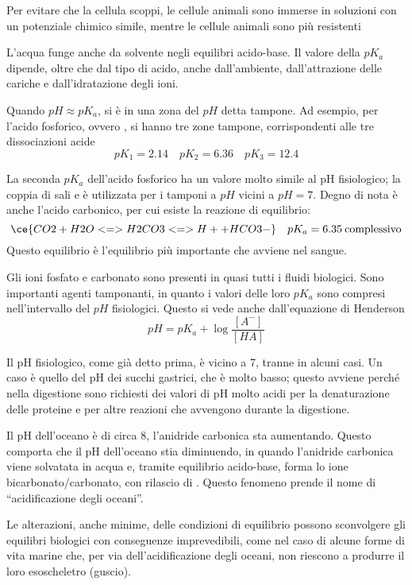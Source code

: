 
Per evitare che la cellula scoppi, le cellule animali sono immerse in
soluzioni con un potenziale chimico simile, mentre le cellule animali
sono più resistenti

L'acqua funge anche da solvente negli equilibri acido-base. Il valore
della \(pK_a\) dipende, oltre che dal tipo di acido, anche
dall'ambiente, dall'attrazione delle cariche e dall'idratazione degli
ioni.

Quando \(pH \approx pK_a\), si è in una zona del \(pH\) detta tampone.
Ad esempio, per l'acido fosforico, ovvero , si hanno tre zone
tampone, corrispondenti alle tre dissociazioni acide
\[
    pK_1=2.14 \quad pK_2=6.36 \quad pK_3=12.4
\]

La seconda \(pK_a\) dell'acido fosforico ha un valore molto simile al pH
fisiologico; la coppia di sali  e  è utilizzata
per i tamponi a \(pH\) vicini a \(pH=7\). Degno di nota è anche l'acido
carbonico, per cui esiste la reazione di equilibrio:
\[
\ce{CO2 + H2O <=> H2CO3 <=> H+ + HCO3-} \quad pK_a=6.35 \:
\text{complessivo}
\]
Questo equilibrio è l'equilibrio più importante
che avviene nel sangue.

Gli ioni fosfato e carbonato sono presenti in quasi tutti i fluidi
biologici. Sono importanti agenti tamponanti, in quanto i valori delle
loro \(pK_a\) sono compresi nell'intervallo del \(pH\) fisiologici.
Questo si vede anche dall'equazione di Henderson
\[
pH = pK_a + \log \frac{[A^-]}{[HA]}
\]


Il pH fisiologico, come già detto prima, è vicino a 7, tranne in alcuni
casi. Un caso è quello del pH dei succhi gastrici, che è molto basso;
questo avviene perché nella digestione sono richiesti dei valori di pH
molto acidi per la denaturazione delle proteine e per altre reazioni che
avvengono durante la digestione.

Il pH dell'oceano è di circa 8, l'anidride carbonica sta aumentando.
Questo comporta che il pH dell'oceano stia diminuendo, in quando
l'anidride carbonica viene solvatata in acqua e, tramite equilibrio
acido-base, forma lo ione bicarbonato/carbonato, con rilascio di
. Questo fenomeno prende il nome di ``acidificazione degli
oceani''.

Le alterazioni, anche minime, delle condizioni di equilibrio possono
sconvolgere gli equilibri biologici con conseguenze imprevedibili, come
nel caso di alcune forme di vita marine che, per via dell'acidificazione
degli oceani, non riescono a produrre il loro esoscheletro (guscio).

